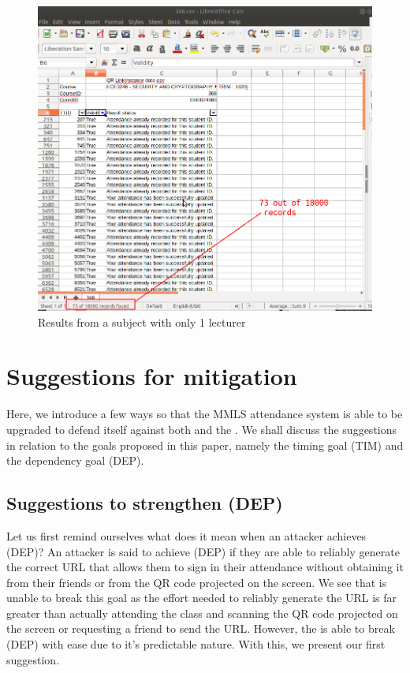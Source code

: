 \documentclass[runningheads]{llncs}
\begin{document}
\begin{figure}
\includegraphics[width=\textwidth]{imgres/sleepin_obs2.png}
\caption{Results from a subject with only 1 lecturer} 
\label{fig:sleepin_obs2}
\end{figure}

\section{Suggestions for mitigation}
Here, we introduce a few ways so that the MMLS attendance system is able to be upgraded to defend itself against both \theattack{} and the \scanattack{}. We shall discuss the suggestions in relation to the goals proposed in this paper, namely the timing goal (TIM) and the dependency goal (DEP). 

\subsection{Suggestions to strengthen (DEP)}
Let us first remind ourselves what does it mean when an attacker achieves (DEP)? An attacker is said to achieve (DEP) if they are able to reliably generate the correct URL that allows them to sign in their attendance without obtaining it from their friends or from the QR code projected on the screen. We see that \theattack{} is unable to break this goal as the effort needed to reliably generate the URL is far greater than actually attending the class and scanning the QR code projected on the screen or requesting a friend to send the URL. However, the \scanattack{} is able to break (DEP) with ease due to it's predictable nature. With this, we present our first suggestion.
\end{document}
